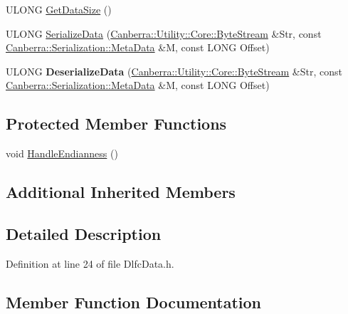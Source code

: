 \begin{DoxyCompactItemize}
\item 
U\+L\+O\+NG \hyperlink{class_canberra_1_1_data_types_1_1_spectroscopy_1_1_dlfc_data_a4b0e2388fef2c2185e4bb2d94b431b11_a4b0e2388fef2c2185e4bb2d94b431b11}{Get\+Data\+Size} ()
\item 
U\+L\+O\+NG \hyperlink{class_canberra_1_1_data_types_1_1_spectroscopy_1_1_dlfc_data_aacc250b1d3e769eddddad762028110de_aacc250b1d3e769eddddad762028110de}{Serialize\+Data} (\hyperlink{class_canberra_1_1_utility_1_1_core_1_1_byte_stream}{Canberra\+::\+Utility\+::\+Core\+::\+Byte\+Stream} \&Str, const \hyperlink{class_canberra_1_1_serialization_1_1_meta_data}{Canberra\+::\+Serialization\+::\+Meta\+Data} \&M, const L\+O\+NG Offset)
\item 
\mbox{\label{class_canberra_1_1_data_types_1_1_spectroscopy_1_1_dlfc_data_a0d4602e5bb6136e647c741b8e7c337d2}} 
U\+L\+O\+NG {\bfseries Deserialize\+Data} (\hyperlink{class_canberra_1_1_utility_1_1_core_1_1_byte_stream}{Canberra\+::\+Utility\+::\+Core\+::\+Byte\+Stream} \&Str, const \hyperlink{class_canberra_1_1_serialization_1_1_meta_data}{Canberra\+::\+Serialization\+::\+Meta\+Data} \&M, const L\+O\+NG Offset)
\end{DoxyCompactItemize}
\subsection*{Protected Member Functions}
\begin{DoxyCompactItemize}
\item 
void \hyperlink{class_canberra_1_1_data_types_1_1_spectroscopy_1_1_dlfc_data_a90ac0d4fa457c81423ab25b9089dfa83_a90ac0d4fa457c81423ab25b9089dfa83}{Handle\+Endianness} ()
\end{DoxyCompactItemize}
\subsection*{Additional Inherited Members}


\subsection{Detailed Description}


Definition at line 24 of file Dlfc\+Data.\+h.



\subsection{Member Function Documentation}
\mbox{\label{class_canberra_1_1_data_types_1_1_spectroscopy_1_1_dlfc_data_a4b0e2388fef2c2185e4bb2d94b431b11_a4b0e2388fef2c2185e4bb2d94b431b11}} 
